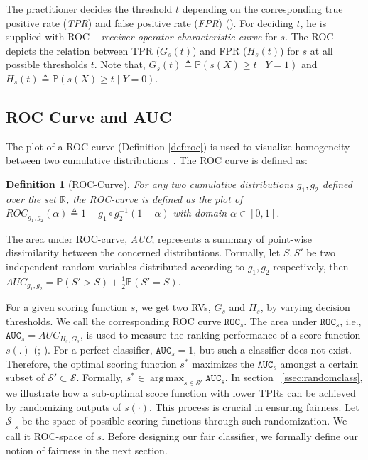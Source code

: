 \documentclass{article}
\DeclareMathOperator*{\argmax}{arg\,max}
\newtheorem{definition}{Definition}[section]
\newcommand{\roc}{\texttt{ROC}_s}
\newcommand{\auc}{\texttt{AUC}_s}
\begin{document}
The practitioner decides the threshold $t$ depending on the corresponding true positive rate (\emph{TPR}) and false positive rate (\emph{FPR}) (\cite{provost00,zhou05}). For deciding $t$, he is supplied with ROC -- \emph{receiver operator characteristic curve} for $s$. The ROC depicts the relation between TPR ($G_s(t)$) and FPR ($H_s(t)$) for $s$ at all possible thresholds $t$.  Note that, 
$G_s(t) \triangleq \mathbb{P}(s(X) \geq t\mid Y = 1)$ and $ H_s(t) \triangleq \mathbb{P}(s(X) \geq t\mid Y = 0)$.



\subsection*{ROC Curve and AUC}
The plot of a ROC-curve 
(Definition \eqref{def:roc}) 
is used to visualize homogeneity between two cumulative distributions~\cite{vogel2021}. 
The ROC curve is defined as:
\begin{definition}[ROC-Curve] \label{def:roc}
For any two cumulative distributions $g_1, g_2$ defined over the set $\mathbb{R}$, the ROC-curve is defined as the plot of 
$
    ROC_{g_1,g_2}(\alpha) \triangleq 1 - g_1 \circ g_2^{-1}(1-\alpha)
$
with domain $\alpha \in [0,1]$.
\end{definition}

The area under ROC-curve, \emph{AUC}, represents a summary of point-wise dissimilarity between the concerned distributions. Formally, let $S, S'$ be two independent random variables distributed according to $g_1, g_2$ respectively, then $AUC_{g_1,g_2} = \mathbb{P}(S'>S) + \frac{1}{2} \mathbb{P}(S' = S)$.

For a given scoring function $s$, we get two RVs, $G_s$ and $H_s$, by varying decision thresholds. We call the corresponding ROC curve $\roc$.
The area under $\roc$, i.e., $\auc =AUC_{H_s, G_s}$, is used to measure the ranking performance of a score function $s(.)$ (\cite{cortes03}; \cite{clemencon08}). 
For a perfect classifier, $\auc = 1$, but such a classifier does not exist. Therefore, the optimal scoring function $s^{*}$ maximizes the $\auc$ amongst a certain subset of $\mathcal{S'}\subset \mathcal{S}$. Formally, $ s^* \in \argmax_{s\in \mathcal{S'}} \auc$.
In section ~\ref{ssec:randomclass}, we illustrate how a sub-optimal score function with lower TPRs can be achieved by randomizing outputs of $s(\cdot)$. This process is crucial in ensuring fairness. Let $\mathcal{S}|_s$ be the space of possible scoring functions through such randomization. We call it ROC-space of $s$.
Before designing our fair classifier, we formally define our notion of fairness in the next section.
\end{document}
